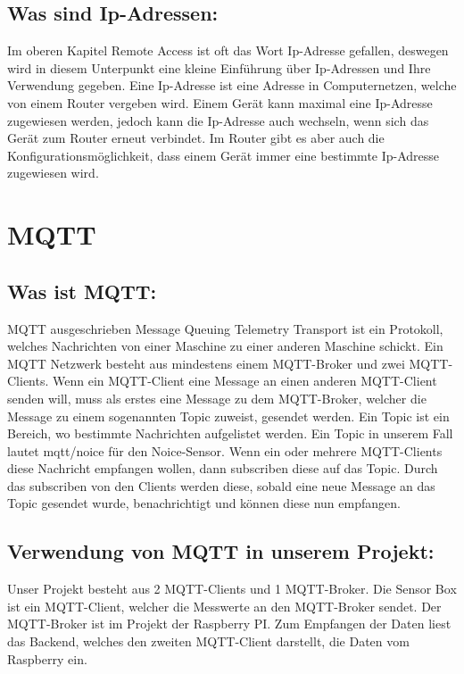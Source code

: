  \subsection{Was sind Ip-Adressen:}
Im oberen Kapitel Remote Access ist oft das Wort Ip-Adresse gefallen, deswegen wird in diesem Unterpunkt eine kleine Einführung über Ip-Adressen und Ihre Verwendung gegeben. 
Eine Ip-Adresse ist eine Adresse in Computernetzen, welche von einem Router vergeben wird.
 Einem Gerät kann maximal eine Ip-Adresse zugewiesen werden, jedoch kann die Ip-Adresse auch wechseln, wenn sich das Gerät zum Router erneut verbindet. 
 Im Router gibt es aber auch die Konfigurationsmöglichkeit, dass einem Gerät immer eine bestimmte Ip-Adresse zugewiesen wird.  \cite{RaSPPIInternetZugriff}






\section{MQTT}

\subsection{Was ist MQTT:}
MQTT ausgeschrieben Message Queuing  Telemetry Transport ist ein Protokoll, welches Nachrichten von einer Maschine zu einer anderen Maschine schickt. 
Ein MQTT Netzwerk besteht  aus mindestens einem MQTT-Broker und zwei MQTT-Clients. 
Wenn ein MQTT-Client eine Message an einen anderen MQTT-Client senden will, muss als erstes eine Message zu dem MQTT-Broker, welcher die Message zu einem sogenannten Topic zuweist, gesendet werden.
Ein Topic ist ein Bereich, wo bestimmte Nachrichten aufgelistet werden. 
Ein Topic in unserem Fall lautet mqtt/noice für den Noice-Sensor.  
Wenn ein oder mehrere MQTT-Clients diese Nachricht empfangen wollen, dann subscriben diese auf das Topic. 
Durch das subscriben von den Clients werden diese, sobald eine neue Message an das Topic gesendet wurde, benachrichtigt und können diese nun empfangen. 
\cite{MQTT}

\subsection {Verwendung von MQTT in unserem Projekt:}
Unser Projekt besteht aus 2 MQTT-Clients und 1 MQTT-Broker. 
Die Sensor Box ist ein MQTT-Client, welcher die Messwerte an den MQTT-Broker sendet. 
Der MQTT-Broker ist im Projekt der Raspberry PI. 
Zum Empfangen der Daten liest das Backend, welches den zweiten MQTT-Client darstellt, die Daten vom Raspberry ein.


